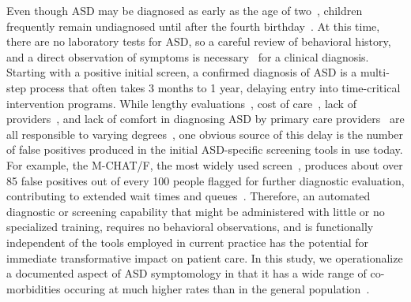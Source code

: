 \documentclass[onecolumn,,10pt]{IEEEtran}
\begin{document}
Even though ASD may be diagnosed as early as the  age of two~\cite{cdc},  children frequently remain undiagnosed  until after the fourth birthday~\cite{pmid24529515}. At this
time, there are no laboratory tests for ASD, so a careful review of behavioral history, and a direct
observation of symptoms is
necessary~\cite{volkmar2014practice,hyman2020identification} for a clinical diagnosis.  Starting with a positive initial screen, a confirmed diagnosis of ASD is a   multi-step process that often takes 3 months to 1 year,  delaying entry into time-critical intervention programs. While   lengthy evaluations~\cite{kalb2012determinants}, cost of care~\cite{bisgaier2011access},  lack of providers~\cite{fenikile2015barriers}, and lack of comfort in diagnosing ASD by primary care providers~\cite{fenikile2015barriers} are all responsible to varying degrees~\cite{gordon2016whittling}, one  obvious source of this delay is the number of false positives produced in the initial ASD-specific screening tools in use today. For example, the  M-CHAT/F, the most widely used screen~\cite{robins2014validation,hyman2020identification},  produces about   over 85 false positives out of every 100 people flagged for further diagnostic evaluation, contributing to extended wait times and queues~\cite{gordon2016whittling}. 
Therefore, an automated   diagnostic or screening capability that might be administered with little or no specialized training, requires no behavioral observations, and is functionally independent of the tools employed in current practice  has the potential for  immediate transformative  impact on patient care. In this study, we operationalize a documented aspect of ASD symptomology in  that it has   a wide range  of co-morbidities occuring at much higher rates than in the general population~\cite{hyman2020identification}.
\end{document}
